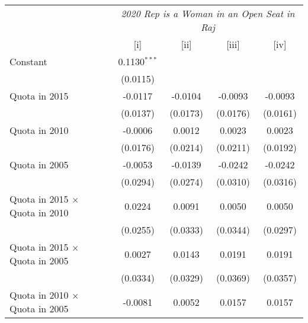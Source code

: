 
\begingroup
\centering
\begin{tabular}{lcccc}
   \toprule
    & \multicolumn{4}{c}{\textit{2020 Rep is a Woman in an Open Seat in Raj}}\\
                                                                   & [i]            & [ii]          & [iii]         & [iv]\\  
   \midrule 
   Constant                                                        & 0.1130$^{***}$ &               &               &   \\   
                                                                   & (0.0115)       &               &               &   \\   
   Quota in 2015                                                   & -0.0117        & -0.0104       & -0.0093       & -0.0093\\   
                                                                   & (0.0137)       & (0.0173)      & (0.0176)      & (0.0161)\\   
   Quota in 2010                                                   & -0.0006        & 0.0012        & 0.0023        & 0.0023\\   
                                                                   & (0.0176)       & (0.0214)      & (0.0211)      & (0.0192)\\   
   Quota in 2005                                                   & -0.0053        & -0.0139       & -0.0242       & -0.0242\\   
                                                                   & (0.0294)       & (0.0274)      & (0.0310)      & (0.0316)\\   
   Quota in 2015 $\times $ Quota in 2010                           & 0.0224         & 0.0091        & 0.0050        & 0.0050\\   
                                                                   & (0.0255)       & (0.0333)      & (0.0344)      & (0.0297)\\   
   Quota in 2015 $\times $ Quota in 2005                           & 0.0027         & 0.0143        & 0.0191        & 0.0191\\   
                                                                   & (0.0334)       & (0.0329)      & (0.0369)      & (0.0357)\\   
   Quota in 2010 $\times $ Quota in 2005                           & -0.0081        & 0.0052        & 0.0157        & 0.0157\\   

\end{tabular}
